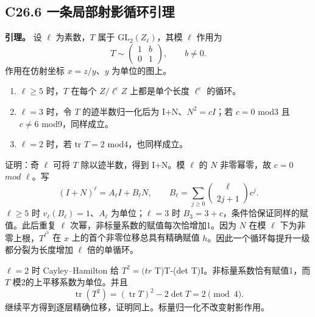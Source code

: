 \documentclass[11pt,a4paper]{article}
\newcommand{\tightlist}{\setlength{\itemsep}{0pt}\setlength{\parskip}{0pt}}
\theoremstyle{definition}
\numberwithin{equation}{section}
\begin{document}
\subsection*{\texorpdfstring{{C26.6} {一条局部射影循环引理}}{C26.6 一条局部射影循环引理}}\label{C26-h164}

\textbf{{引理。}} {设} {\ensuremath{\ell }} {为素数，\ensuremath{T}} {属于} {\ensuremath{\mathrm{GL}_{2}(Z_\ell )}，其模} {\ensuremath{\ell }} {作用为} \[
T\sim\begin{pmatrix}1&b\\0&1\end{pmatrix},\qquad b\ne0.
\] {作用在仿射坐标} {\ensuremath{x=z/y}、\ensuremath{y}} {为单位的图上。}

\begin{enumerate}
\def\labelenumi{\arabic{enumi}.}
\tightlist
\item
  {\ensuremath{\ell \ge 5}} {时，\ensuremath{T}} {在每个} {\ensuremath{Z/\ell ^{e}Z}} {上都是单个长度} {\ensuremath{\ell ^{e}}} {的循环。}
\item
  {\ensuremath{\ell =3}} {时，令} {\ensuremath{T}} {的迹半数归一化后为} {I+N、\ensuremath{N^{2}=cI}；若} {\ensuremath{c=0}} {mod3} {且} {\ensuremath{c\ne 6}} {mod9，同样成立。}
\item
  {\ensuremath{\ell =2}} {时，若} {tr} {\ensuremath{T=2}} {mod4，也同样成立。}
\end{enumerate}

{证明：奇} {\ensuremath{\ell }} {可将} {\ensuremath{T}} {除以迹半数，得到} {I+N。模} {\ensuremath{\ell }} {的} {\ensuremath{N}} {非零幂零，故} {\ensuremath{c=0}} {\ensuremath{mod}} {\ensuremath{\ell }。写} \[
(I+N)^\ell=A_\ell I+B_\ell N,\qquad
B_\ell=\sum_{j\ge0}\binom{\ell}{2j+1}c^j.
\] {\ensuremath{\ell \ge 5}} {时} {\ensuremath{v_\ell (B_\ell )=1}、\ensuremath{A_\ell }} {为单位；\ensuremath{\ell =3}} {时} {\ensuremath{B_{3}=3+c}，条件恰保证同样的赋值。此后重复} {\ensuremath{\ell }} {次幂，非标量系数的赋值每次恰增加1。因为} {\ensuremath{N}} {在模} {\ensuremath{\ell }} {下为非零上根，\ensuremath{T^{\ell ^{h}}}} {在} {\ensuremath{x}} {上的首个非零位移总具有精确赋值} {\ensuremath{h}。因此一个循环每提升一级都分裂为长度增加} {\ensuremath{\ell }} {倍的单循环。}

{\ensuremath{\ell =2}} {时} {Cayley--Hamilton} {给} {\ensuremath{T^{2}=(tr}} {T)T-(det} {T)I。非标量系数恰有赋值1，而} {\ensuremath{T}} {模2的上平移系数为单位。并且} \[
\operatorname{tr}(T^2)=(\operatorname{tr}T)^2-2\det T=2\pmod4.
\] {继续平方得到逐层精确位移，证明同上。标量归一化不改变射影作用。}
\end{document}
